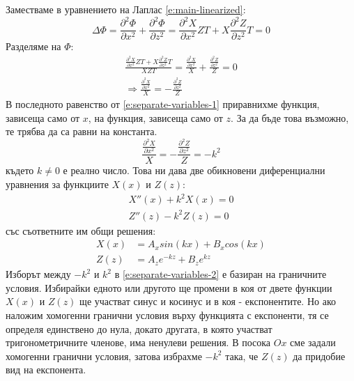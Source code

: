 \documentclass[12pt]{article}
\numberwithin{equation}{section}
\begin{document}
Заместваме в уравнението на Лаплас \autoref{e:main-linearized}:
\begin{equation}
    \Delta\Phi
    = \frac{\partial^2 \Phi}{\partial x^2} + \frac{\partial^2 \Phi}{\partial z^2}
    = \frac{\partial^2 X}{\partial x^2}ZT + X\frac{\partial^2 Z}{\partial z^2}T
    = 0
\end{equation}
Разделяме на $\Phi$:
\begin{equation}
    \label{e:separate-variables-1}
    \begin{split}
        \frac{\frac{\partial^2 X}{\partial x^2}ZT + X\frac{\partial^2 Z}{\partial z^2}T}{XZT}
        = \frac{\frac{\partial^2 X}{\partial x^2}}{X} + \frac{\frac{\partial^2 Z}{\partial z^2}}{Z}
        = 0 \\
        \Rightarrow
        \frac{\frac{\partial^2 X}{\partial x^2}}{X} = -\frac{\frac{\partial^2 Z}{\partial z^2}}{Z}
    \end{split}
\end{equation}
В последното равенство от \autoref{e:separate-variables-1} приравнихме функция, зависеща само от $x$, на функция, зависеща само от $z$. За да бъде това възможно, те трябва да са равни на константа.
\begin{equation}
    \label{e:separate-variables-2}
    \frac{\frac{\partial^2 X}{\partial x^2}}{X} = -\frac{\frac{\partial^2 Z}{\partial z^2}}{Z} = -k^2
\end{equation}
където $k\neq 0$ е реално число. Това ни дава две обикновени диференциални уравнения за функциите $X(x)$ и $Z(z)$:
\begin{equation}
    \begin{split}
        X''(x) + k^2 X(x) = 0 \\
        Z''(z) - k^2 Z(z) = 0
    \end{split}
\end{equation}
със съответните им общи решения:
\begin{equation}
    \label{e:separable-variables-general-solution}
    \begin{aligned}
        X(x) &= A_x sin(kx) + B_x cos(kx) \\
        Z(z) &= A_z e^{-kz} + B_z e^{kz}
    \end{aligned}
\end{equation}
Изборът между $-k^2$ и $k^2$ в \autoref{e:separate-variables-2} е базиран на граничните условия. Избирайки едното или другото ще промени в коя от двете функции $X(x)$ и $Z(z)$ ще участват синус и косинус и в коя - експонентите. Но ако наложим хомогенни гранични условия върху функцията с експоненти, тя се определя единствено до нула, докато другата, в която участват тригонометричните членове, има ненулеви решения. В посока $Ox$ сме задали хомогенни гранични условия, затова избрахме $-k^2$ така, че $Z(z)$ да придобие вид на експонента.
\end{document}
